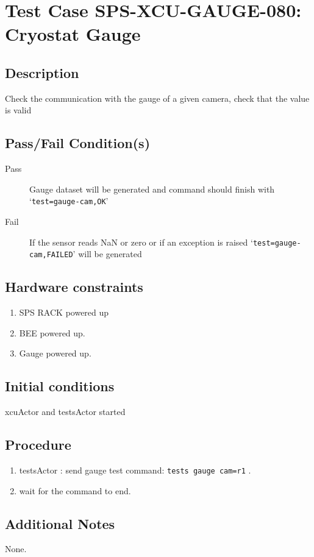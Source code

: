 \section{Test Case SPS-XCU-GAUGE-080: Cryostat Gauge}

\subsection{Description}

Check the communication with the gauge of a given camera, check that the value is valid

\subsection{Pass/Fail Condition(s)}

\begin{description}
\item [Pass] Gauge dataset will be generated and command should finish with `\texttt{test=gauge-cam,OK}'
\item [Fail] If the sensor reads NaN or zero or if an exception is raised `\texttt{test=gauge-cam,FAILED}' will be generated

\end{description}

\subsection{Hardware constraints}

\begin{enumerate}
    \item SPS RACK powered up
    \item BEE powered up.
    \item Gauge powered up.
\end{enumerate}

\subsection{Initial conditions}

xcuActor and testsActor started

\subsection{Procedure}

\begin{enumerate}
    \item testsActor : send gauge test command: \texttt{tests gauge cam=r1} .
    \item wait for the command to end.
\end{enumerate}

\subsection{Additional Notes}
None.
